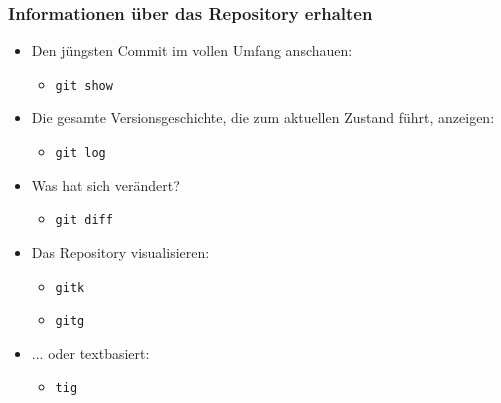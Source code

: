 \documentclass{beamer}
\begin{document}
\begin{frame}
 \frametitle{Informationen über das Repository erhalten}
  


\begin{itemize}
  \item Den jüngsten Commit im vollen Umfang anschauen:
\begin{itemize}
  \item \texttt{git show}
\end{itemize}
\end{itemize}

\begin{itemize}
  \item Die gesamte Versionsgeschichte, die zum aktuellen Zustand führt, anzeigen:
\begin{itemize}
  \item \texttt{git log}
\end{itemize}
\end{itemize}

\begin{itemize}
  \item Was hat sich verändert?
\begin{itemize}
  \item \texttt{git diff}
\end{itemize}
\end{itemize}

\begin{itemize}
  \item Das Repository visualisieren:
\begin{itemize}
  \item \texttt{gitk}
  \item \texttt{gitg}
\end{itemize}
  \item ... oder textbasiert:
\begin{itemize}
  \item \texttt{tig}
\end{itemize}
\end{itemize}

  
 \end{frame}
\end{document}
